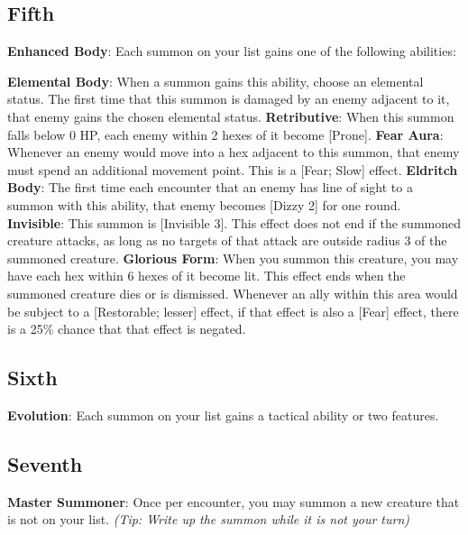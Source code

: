 \begin{multicols}{2}
\subsection*{Fifth \Facet\perk}
\textbf{Enhanced Body}: Each summon on your list gains one of the following abilities:
\begin{itemize}
\thing \textbf{Elemental Body}: When a summon gains this ability, choose an elemental status. The first time that this summon is damaged by an enemy adjacent to it, that enemy gains the chosen elemental status.
\thing \textbf{Retributive}: When this summon falls below 0 HP, each enemy within 2 hexes of it become [Prone].
\thing \textbf{Fear Aura}: Whenever an enemy would move into a hex adjacent to this summon, that enemy must spend an additional movement point. This is a [Fear; Slow] effect.
\thing \textbf{Eldritch Body}: The first time each encounter that an enemy has line of sight to a summon with this ability, that enemy becomes [Dizzy 2] for one round.
\thing \textbf{Invisible}: This summon is [Invisible 3]. This effect does not end if the summoned creature attacks, as long as no targets of that attack are outside radius 3 of the summoned creature.
\thing \textbf{Glorious Form}: When you summon this creature, you may have each hex within 6 hexes of it become lit. This effect ends when the summoned creature dies or is dismissed. Whenever an ally within this area would be subject to a [Restorable; lesser] effect, if that effect is also a [Fear] effect, there is a 25\% chance that that effect is negated.\end{itemize}

\subsection*{Sixth \Facet}
\textbf{Evolution}: Each summon on your list gains a tactical ability or two features.

\subsection*{Seventh \Facet\perk}
\textbf{Master Summoner}: Once per encounter, you may summon a new creature that is not on your list. \emph{(Tip: Write up the summon while it is not your turn)}

\end{multicols}
